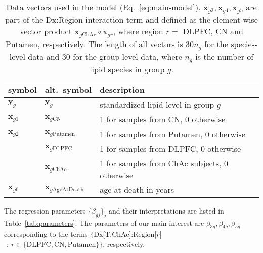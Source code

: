 \documentclass[letterpaper]{article}
\begin{document}
\begin{table}
\begin{tabular}[]{lll}
 \hline
 symbol            &  alt.~symbol                        & description \\
 \hline
 $\mathbf{y}_{g}$  & $\mathbf{y}_{g}$                    & standardized lipid level in group $g$ \\
 $\mathbf{x}_{g1}$ & $\mathbf{x}_{g\mathrm{CN}}$         & 1 for samples from CN, 0 otherwise \\
 $\mathbf{x}_{g2}$ & $\mathbf{x}_{g\mathrm{Putamen}}$    & 1 for samples from Putamen, 0 otherwise \\
                   & $\mathbf{x}_{g\mathrm{DLPFC}}$      & 1 for samples from DLPFC, 0 otherwise \\
                   & $\mathbf{x}_{g\mathrm{ChAc}}$       & 1 for samples from ChAc subjects, 0 otherwise \\
 $\mathbf{x}_{g6}$ & $\mathbf{x}_{g\mathrm{AgeAtDeath}}$ & age at death in years \\
 \hline
\end{tabular}
\caption{Data vectors used in the model (Eq.~\ref{eq:main-model}).
$\mathbf{x}_{g3}, \mathbf{x}_{g4}, \mathbf{x}_{g5}$ are part of the Dx:Region
interaction term and defined as the element-wise vector product $\mathbf{x}_{g\mathrm{ChAc}} \circ
\mathbf{x}_{gr}$, where region $r =$ DLPFC, CN and Putamen,
respectively. The length of all vectors is $30 n_g$ for the species-level data
and $30$ for the group-level data, where $n_g$ is the number of lipid species
in group $g$.}
\label{tab:data-vectors}
\end{table}

The regression parameters $\{\beta_{gj}\}_j$ and their interpretations are
listed in Table~\ref{tab:parameters}.  The parameters of our main interest are
$\beta_{3g}, \beta_{4g}, \beta_{5g}$ corresponding to the terms
$\{$Dx[T.ChAc]:Region[$r$]$ \; : \; r \in \{\mathrm{DLPFC}, \mathrm{CN},
\mathrm{Putamen}\}\}$, respectively.
\end{document}
